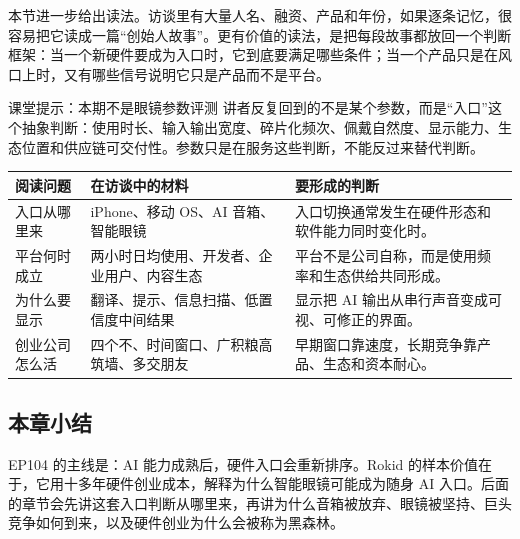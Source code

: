 本节进一步给出读法。访谈里有大量人名、融资、产品和年份，如果逐条记忆，很容易把它读成一篇“创始人故事”。更有价值的读法，是把每段故事都放回一个判断框架：当一个新硬件要成为入口时，它到底要满足哪些条件；当一个产品只是在风口上时，又有哪些信号说明它只是产品而不是平台。

\begin{knowledgebox}{课堂提示：本期不是眼镜参数评测}
讲者反复回到的不是某个参数，而是“入口”这个抽象判断：使用时长、输入输出宽度、碎片化频次、佩戴自然度、显示能力、生态位置和供应链可交付性。参数只是在服务这些判断，不能反过来替代判断。
\end{knowledgebox}

\noindent\begin{tabularx}{\textwidth}{p{}p{}X}
\toprule
阅读问题 & 在访谈中的材料 & 要形成的判断 \\
\midrule
入口从哪里来 & iPhone、移动 OS、AI 音箱、智能眼镜 & 入口切换通常发生在硬件形态和软件能力同时变化时。 \\
平台何时成立 & 两小时日均使用、开发者、企业用户、内容生态 & 平台不是公司自称，而是使用频率和生态供给共同形成。 \\
为什么要显示 & 翻译、提示、信息扫描、低置信度中间结果 & 显示把 AI 输出从串行声音变成可视、可修正的界面。 \\
创业公司怎么活 & 四个不、时间窗口、广积粮高筑墙、多交朋友 & 早期窗口靠速度，长期竞争靠产品、生态和资本耐心。 \\
\bottomrule
\end{tabularx}

\subsection{本章小结}

EP104 的主线是：AI 能力成熟后，硬件入口会重新排序。Rokid 的样本价值在于，它用十多年硬件创业成本，解释为什么智能眼镜可能成为随身 AI 入口。后面的章节会先讲这套入口判断从哪里来，再讲为什么音箱被放弃、眼镜被坚持、巨头竞争如何到来，以及硬件创业为什么会被称为黑森林。

